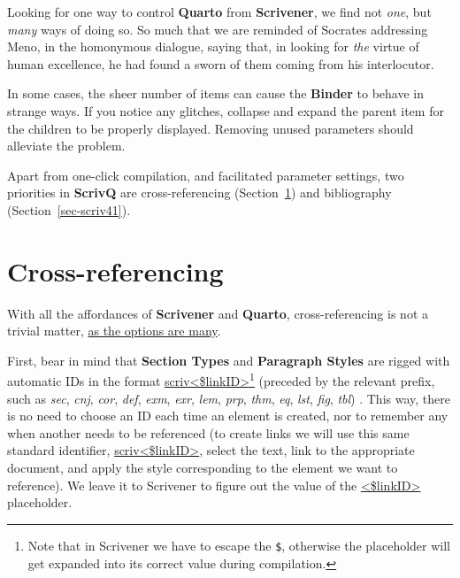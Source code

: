 \documentclass[
  12pt,
  a4paper,
  oneside,
  numbers=noenddot,
  titlepage,
  toclink=all,
  toc=bibliography]{scrbook}
\theoremstyle{definition}
\theoremstyle{definition}
\theoremstyle{definition}
\theoremstyle{plain}
\theoremstyle{plain}
\theoremstyle{plain}
\theoremstyle{plain}
\theoremstyle{plain}
\theoremstyle{remark}
\begin{document}
Looking for one way to control \textbf{Quarto} from \textbf{Scrivener},
we find not \emph{one}, but \emph{many} ways of doing so. So much that
we are reminded of Socrates addressing Meno, in the homonymous dialogue,
saying that, in looking for \emph{the} virtue of human excellence, he
had found a sworn of them coming from his interlocutor.

\begin{tcolorbox}[enhanced jigsaw, titlerule=0mm, left=2mm, toptitle=1mm, colback=white, coltitle=black, rightrule=.15mm, arc=.35mm, title=\textcolor{quarto-callout-caution-color}{\faFire}\hspace{0.5em}{Binder glitches}, colframe=quarto-callout-caution-color-frame, bottomrule=.15mm, colbacktitle=quarto-callout-caution-color!10!white, toprule=.15mm, breakable, bottomtitle=1mm, opacityback=0, opacitybacktitle=0.6, leftrule=.75mm]

In some cases, the sheer number of items can cause the \textbf{Binder}
to behave in strange ways. If you notice any glitches, collapse and
expand the parent item for the children to be properly displayed.
Removing unused parameters should alleviate the problem.

\end{tcolorbox}

Apart from one-click compilation, and facilitated parameter settings,
two priorities in \textbf{ScrivQ} are cross-referencing
(\protect\hypertarget{cite_3}{}{\label{cite_3}Section~\ref{sec-scriv3}})
and bibliography
(\protect\hypertarget{cite_4}{}{\label{cite_4}Section~\ref{sec-scriv41}}).

\hypertarget{sec-scriv3}{%
\chapter{Cross-referencing}\label{sec-scriv3}}

With all the affordances of \textbf{Scrivener} and \textbf{Quarto},
cross-referencing is not a trivial matter, \ul{as the options are many}.

{}First,
bear in mind that \textbf{Section Types} and \textbf{Paragraph Styles}
are rigged with automatic IDs in the format
\ul{scriv\textless\$linkID\textgreater{}}\footnote{Note that in
  Scrivener we have to escape the \texttt{\$}, otherwise the placeholder
  will get expanded into its correct value during compilation.}
(preceded by the relevant prefix, such as \emph{sec}, \emph{cnj},
\emph{cor}, \emph{def}, \emph{exm}, \emph{exr}, \emph{lem}, \emph{prp},
\emph{thm}, \emph{eq}, \emph{lst}, \emph{fig}, \emph{tbl}) . This way,
there is no need to choose an ID each time an element is created, nor to
remember any when another needs to be referenced (to create links we
will use this same standard identifier,
\ul{scriv\textless\$linkID\textgreater{}}, select the text, link to the
appropriate document, and apply the style corresponding to the element
we want to reference). We leave it to Scrivener to figure out the value
of the \ul{\textless\$linkID\textgreater{}} placeholder.
\end{document}
